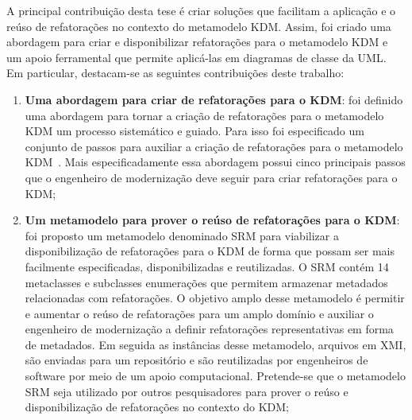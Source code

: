 A principal contribuição desta tese é criar soluções que facilitam a aplicação e o reúso de refatorações no contexto do metamodelo KDM. Assim, foi criado uma abordagem para criar e disponibilizar refatorações para o metamodelo KDM e um apoio ferramental que permite aplicá-las em diagramas de classe da UML. %
%
Em particular, destacam-se as seguintes contribuições deste trabalho:

\begin{enumerate}

\item \textbf{Uma abordagem para criar de refatorações para o KDM}: foi definido uma abordagem para tornar a criação de refatorações para o metamodelo KDM um processo sistemático e guiado. Para isso foi especificado um conjunto de passos para auxiliar a criação de refatorações para o metamodelo KDM~\cite{durelli_catalogo}. Mais especificadamente essa abordagem possui cinco principais passos que o engenheiro de modernização deve seguir para criar refatorações para o KDM;

\item \textbf{Um metamodelo para prover o reúso de refatorações para o KDM}: foi proposto um metamodelo denominado SRM para viabilizar a disponibilização de refatorações para o KDM de forma que possam ser mais facilmente especificadas, disponibilizadas e reutilizadas. O SRM contém 14 metaclasses e subclasses enumerações que permitem armazenar metadados relacionadas com refatorações. O objetivo amplo desse metamodelo é permitir e aumentar o reúso de refatorações para um amplo domínio e auxiliar o engenheiro de modernização a definir refatorações representativas em forma de metadados. Em seguida as instâncias desse metamodelo, arquivos em XMI, são enviadas para um repositório e são reutilizadas por engenheiros de software por meio de um apoio computacional. Pretende-se que o metamodelo SRM seja utilizado por outros pesquisadores para prover o reúso e disponibilização de refatorações no contexto do KDM;



\end{enumerate}

